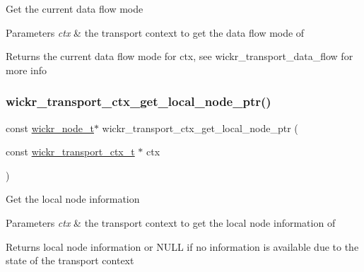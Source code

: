 Get the current data flow mode


\begin{DoxyParams}{Parameters}
{\em ctx} & the transport context to get the data flow mode of \\
\hline
\end{DoxyParams}
\begin{DoxyReturn}{Returns}
the current data flow mode for \textquotesingle{}ctx\textquotesingle{}, see \textquotesingle{}wickr\+\_\+transport\+\_\+data\+\_\+flow\textquotesingle{} for more info 
\end{DoxyReturn}
\mbox{\label{group__wickr__transport__ctx_ga7bcb60a2739744e08cce0c18ce7f01ba}} 
\subsubsection{\texorpdfstring{wickr\+\_\+transport\+\_\+ctx\+\_\+get\+\_\+local\+\_\+node\+\_\+ptr()}{wickr\_transport\_ctx\_get\_local\_node\_ptr()}}
{\footnotesize\ttfamily const \mbox{\hyperlink{structwickr__node}{wickr\+\_\+node\+\_\+t}}$\ast$ wickr\+\_\+transport\+\_\+ctx\+\_\+get\+\_\+local\+\_\+node\+\_\+ptr (\begin{DoxyParamCaption}\item[{const \mbox{\hyperlink{structwickr__transport__ctx}{wickr\+\_\+transport\+\_\+ctx\+\_\+t}} $\ast$}]{ctx }\end{DoxyParamCaption})}

Get the local node information


\begin{DoxyParams}{Parameters}
{\em ctx} & the transport context to get the local node information of \\
\hline
\end{DoxyParams}
\begin{DoxyReturn}{Returns}
local node information or N\+U\+LL if no information is available due to the state of the transport context 
\end{DoxyReturn}
\mbox{\label{group__wickr__transport__ctx_gad9baf62b25d23b9c6ecd5cec0fc9d6f5}} 
